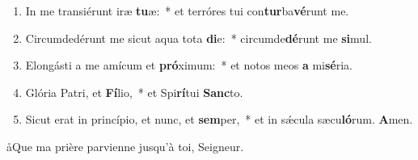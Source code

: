 \documentclass[twoside]{article}
\begin{document}
\begin{paracol}[1]{2}
\begin{enumerate}[wide, itemsep=0mm, labelwidth=!, labelindent=0pt, label=\color{gregoriocolor}\theenumi]
\item In me transiérunt iræ \textbf{tu}æ:~* et terróres tui con\textbf{tur}ba\textbf{vé}runt me.
\item Circumdedérunt me sicut aqua tota \textbf{di}e:~* circumde\textbf{dé}runt me \textbf{si}mul.
\item Elongásti a me amícum et \textbf{pró}ximum:~* et notos meos \textbf{a} mi\textbf{sé}ria.
\item Glória Patri, et \textbf{Fí}lio,~* et Spi\textbf{rí}tui \textbf{Sanc}to.
\item Sicut erat in princípio, et nunc, et \textbf{sem}per,~* et in sǽcula sæcu\textbf{ló}rum. \textbf{A}men.\capsaut{}
\end{enumerate}

\switchcolumn


\aa Que ma prière parvienne jusqu'à toi, Seigneur.


\end{paracol}
\end{document}
